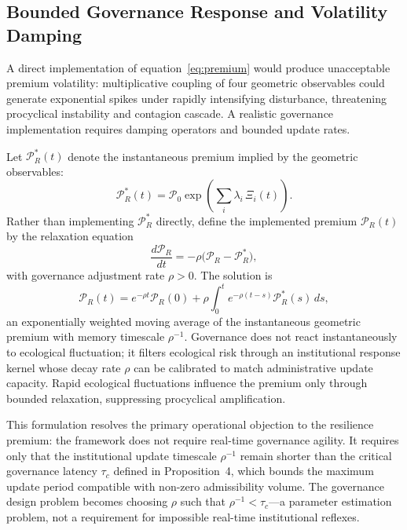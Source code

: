 \documentclass[12pt]{article}
\begin{document}
\subsection{Bounded Governance Response and Volatility Damping}

A direct implementation of equation~\eqref{eq:premium} would produce unacceptable
premium volatility: multiplicative coupling of four geometric observables could generate
exponential spikes under rapidly intensifying disturbance, threatening procyclical
instability and contagion cascade. A realistic governance implementation requires damping
operators and bounded update rates.

Let $\mathcal{P}_R^*(t)$ denote the instantaneous premium implied by the geometric
observables:
\begin{equation}
\mathcal{P}_R^*(t)
= \mathcal{P}_0\exp\!\left(\sum_i \lambda_i\,\Xi_i(t)\right).
\end{equation}
Rather than implementing $\mathcal{P}_R^*$ directly, define the implemented premium
$\mathcal{P}_R(t)$ by the relaxation equation
\begin{equation}
\label{eq:premium-damped}
\frac{d\mathcal{P}_R}{dt}
= -\rho\bigl(\mathcal{P}_R - \mathcal{P}_R^*\bigr),
\end{equation}
with governance adjustment rate $\rho>0$. The solution is
\begin{equation}
\mathcal{P}_R(t)
= e^{-\rho t}\mathcal{P}_R(0)
+ \rho\int_0^t e^{-\rho(t-s)}\mathcal{P}_R^*(s)\,ds,
\end{equation}
an exponentially weighted moving average of the instantaneous geometric premium with
memory timescale $\rho^{-1}$. Governance does not react instantaneously to ecological
fluctuation; it filters ecological risk through an institutional response kernel whose
decay rate $\rho$ can be calibrated to match administrative update capacity. Rapid
ecological fluctuations influence the premium only through bounded relaxation,
suppressing procyclical amplification.

This formulation resolves the primary operational objection to the resilience premium:
the framework does not require real-time governance agility. It requires only that the
institutional update timescale $\rho^{-1}$ remain shorter than the critical governance
latency $\tau_c$ defined in Proposition~4, which bounds the maximum update period
compatible with non-zero admissibility volume. The governance design problem becomes
choosing $\rho$ such that $\rho^{-1} < \tau_c$---a parameter estimation problem, not
a requirement for impossible real-time institutional reflexes.
\end{document}
